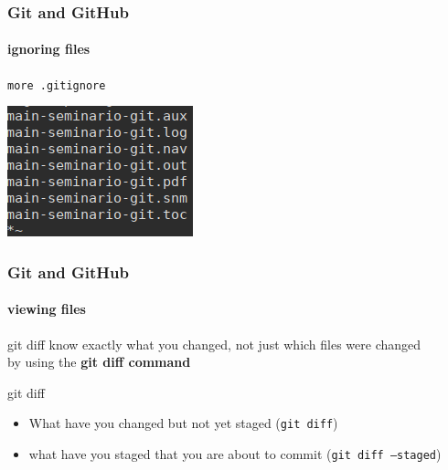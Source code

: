 \begin{frame}
	\frametitle{Git and GitHub}
    \framesubtitle{ignoring files}
    \addtocounter{nframe}{1}

	\begin{center}
		\texttt{more .gitignore}
	\end{center}
	
	\begin{center}
		\includegraphics[width=.7\textwidth]{imgs/gitignore.png}
	\end{center}

\end{frame}

\begin{frame}
	\frametitle{Git and GitHub}
    \framesubtitle{viewing files}
    \addtocounter{nframe}{1}

	\begin{block}{git diff}
		know exactly what you changed, not just which files were changed\\
		by using the \textbf{git diff command}
	\end{block}

	\begin{block}{git diff}
		\begin{itemize}
			\item What have you changed but not yet staged (\texttt{git diff})
			\item what have you staged that you are about to commit (\texttt{git diff --staged})
		\end{itemize}
	
	\end{block}

\end{frame}

